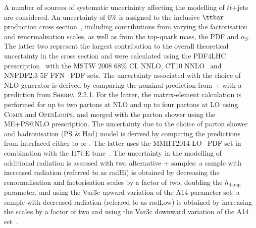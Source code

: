 A number of sources of systematic uncertainty affecting the modelling of $t\bar{t}$+jets are considered. 
An uncertainty of  6\% is assigned to the inclusive $\ttbar$ production
cross section~\cite{Czakon:2011xx}, including contributions from varying the factorisation and renormalisation 
scales, as well as from the top-quark mass, the PDF and $\alpha_{\textrm{S}}$. The latter two represent the largest contribution 
to the overall theoretical uncertainty in the cross section and were calculated using the PDF4LHC prescription~\cite{Botje:2011sn} 
with the MSTW 2008 68\% CL NNLO, CT10 NNLO~\cite{Lai:2010vv,Gao:2013xoa} and NNPDF2.3 5F FFN~\cite{Ball:2012cx} PDF sets.
The uncertainty associated with the choice of NLO generator is derived by comparing the nominal prediction from
{\powheg}+{\pythiaeight} with a prediction from \textsc{Sherpa}~2.2.1. For the latter, the matrix-element calculation is performed 
for up to two partons at NLO and up to four partons at LO using \textsc{Comix} and \textsc{OpenLoops}, and
merged with the {\sherpa} parton shower using the ME+PS@NLO prescription.
The uncertainty due to the choice of parton shower and hadronisation (PS \& Had) model is derived 
by comparing the predictions from {\powheg} interfaced either to {\pythiaeight} or {}. 
The latter uses the MMHT2014 LO~\cite{Harland-Lang:2014zoa} PDF set in combination with the H7UE tune~\cite{Bellm:2015jjp}.
The uncertainty in the modelling of additional radiation is assessed with two alternative {\powheg}+{\pythiaeight} samples:
a sample with increased radiation (referred to as radHi) is obtained by decreasing the renormalisation and factorisation scales  
by a factor of two, doubling the $h_{\textrm{damp}}$ parameter, and using the Var3c upward variation of the A14 parameter set;
a sample with decreased radiation (referred to as radLow) is obtained by increasing the scales by a factor of two 
and using the Var3c downward variation of the A14 set~\cite{ATL-PHYS-PUB-2016-004}.

